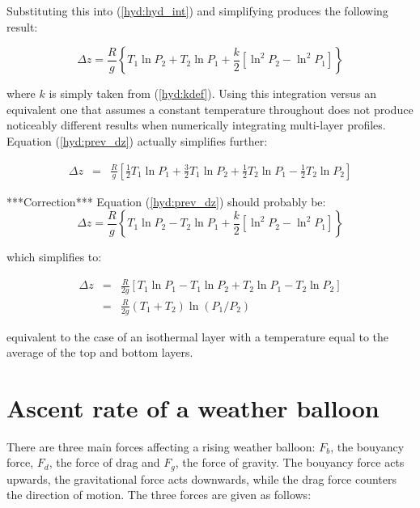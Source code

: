 \documentclass[12pt]{report}
\begin{document}
\begin{flushleft}
Substituting this into (\ref{hyd:hyd_int}) and simplifying produces the following result:

\begin{equation}
\Delta z = \frac{R}{g} \left \lbrace T_1 \ln P_2 + T_2 \ln P_1 +
 	\frac{k}{2} \left [ \ln^2 P_2 - \ln^2 P_1 \right ] \right \rbrace
\label{hyd:prev_dz}
\end{equation}

where $k$ is simply taken from (\ref{hyd:kdef}).  Using this integration versus an equivalent
one that assumes a constant temperature throughout does not produce 
noticeably different results when numerically integrating multi-layer profiles.
\linebreak
\linebreak
Equation (\ref{hyd:prev_dz}) actually simplifies further:

\begin{eqnarray}
  \Delta z & = & \frac{R}{g} \left [ \frac {1}{2} T_1 \ln P_1 + \frac{3}{2} T_1 \ln P_2 + 
		\frac{1}{2} T_2 \ln P_1 - \frac{1}{2} T_2 \ln P_2 \right ] 
\end{eqnarray}

***Correction*** 
\linebreak
\linebreak
Equation (\ref{hyd:prev_dz}) should probably be:
\begin{equation}
\Delta z = \frac{R}{g} \left \lbrace T_1 \ln P_2 - T_2 \ln P_1 +
 	\frac{k}{2} \left [ \ln^2 P_2 - \ln^2 P_1 \right ] \right \rbrace
\end{equation}

which simplifies to:

\begin{eqnarray}
  \Delta z & = & \frac{R}{2g} \left [ T_1 \ln P_1 - T_1 \ln P_2 + 
		 T_2 \ln P_1 -  T_2 \ln P_2 \right ] \\
  & = & \frac{R}{2g} (T_1 + T_2) \ln (P_1 / P_2)
\end{eqnarray}

equivalent to the case of an isothermal layer with a temperature equal to
the average of the top and bottom layers.

\section{Ascent rate of a weather balloon}

There are three main forces affecting a rising weather balloon:  $F_b$, 
the bouyancy force, $F_d$, the force of drag and $F_g$, the force of 
gravity.  The bouyancy force acts upwards, the gravitational force
acts downwards, while the drag force counters the direction of motion.
The three forces are given as follows:


\end{flushleft}
\end{document}
